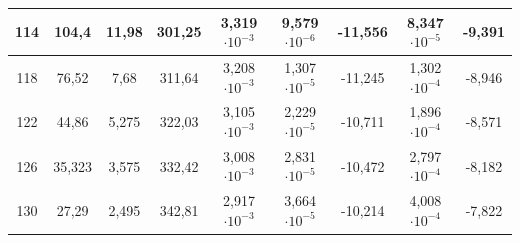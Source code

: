 \documentclass[11pt]{article}
\begin{document}
\begin{table}[h!]
\begin{tabular}{|c|c|c|c|c|c|c|c|c|}
114            & 104,4          & 11,98   & 301,25 & 3,319$\cdot10^{-3}$ & 9,579$\cdot10^{-6}$&-11,556 & 8,347$\cdot10^{-5}$ & -9,391  \\ \hline
118            & 76,52          & 7,68    & 311,64 & 3,208$\cdot10^{-3}$ & 1,307$\cdot10^{-5}$&-11,245 & 1,302$\cdot10^{-4}$ & -8,946  \\ \hline
122            & 44,86          & 5,275   & 322,03 & 3,105$\cdot10^{-3}$ & 2,229$\cdot10^{-5}$&-10,711 & 1,896$\cdot10^{-4}$ & -8,571  \\ \hline
126            & 35,323         & 3,575   & 332,42 & 3,008$\cdot10^{-3}$ & 2,831$\cdot10^{-5}$&-10,472 & 2,797$\cdot10^{-4}$ & -8,182  \\ \hline
130            & 27,29          & 2,495   & 342,81 & 2,917$\cdot10^{-3}$ & 3,664$\cdot10^{-5}$&-10,214 & 4,008$\cdot10^{-4}$ & -7,822  \\ \hline
\end{tabular}
\end{table}
\end{document}
